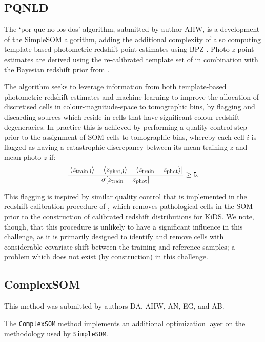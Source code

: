 \documentclass[twocolumn,twocolappendix]{aastex63}
\begin{document}
\subsection{PQNLD} \label{sec:pqnld}

The `por que no los dos' algorithm, submitted by author AHW, is a development of the SimpleSOM algorithm, adding the 
additional complexity of also computing template-based photometric redshift point-estimates using BPZ 
\citep{Benitez:2000}. Photo-$z$ point-estimates are derived using the re-calibrated 
template set of \cite{Capak:2004} in combination with 
the Bayesian redshift prior from \cite{Raichoor/etal:2014}. 

The algorithm seeks to leverage information from both template-based 
photometric redshift estimates and machine-learning to improve the allocation of discretised cells in 
colour-magnitude-space to tomographic bins, by flagging and discarding sources which reside in cells that have 
significant colour-redshift degeneracies. In practice this is achieved by performing a quality-control step prior to 
the assignment of SOM cells to tomographic bins, whereby each cell $i$ is flagged as having a catastrophic 
discrepancy between its mean training $z$ and mean photo-$z$ if: 
\begin{equation}
\frac{|\langle z_{\rm train,i}\rangle - \langle z_{\rm phot,i}\rangle  -\langle z_{\rm train} - z_{\rm phot}\rangle|}
{\sigma[z_{\rm train} - z_{\rm phot}]} \geq 5.
\end{equation}

This flagging is inspired by similar quality control that is implemented in the redshift calibration procedure of
\citet{Wright/etal:2020a}, which removes pathological cells in the SOM prior to the construction of calibrated 
redshift distributions for KiDS. We note, though, that this procedure is unlikely to have a significant influence in this 
challenge, as it is primarily designed to identify and remove cells with considerable covariate shift between the 
training and reference samples; a problem which does not exist (by construction) in this challenge.


\subsection{ {\sc ComplexSOM} } \label{sec:csom}
This method was submitted by authors DA, AHW, AN, EG, and AB.

The {\tt ComplexSOM} method implements an additional optimization layer on the
methodology used by {\tt SimpleSOM}.
\end{document}
